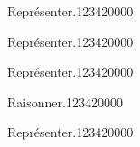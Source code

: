 \begin{pageParcoursu} 

\begin{ExoCu}{Représenter.}{1234}{2}{0}{0}{0}{0}


 
 

\end{ExoCu}
\begin{ExoCu}{Représenter.}{1234}{2}{0}{0}{0}{0}

 
 
 


\end{ExoCu}
\begin{ExoCu}{Représenter.}{1234}{2}{0}{0}{0}{0}


\end{ExoCu}


\begin{ExoCu}{Raisonner.}{1234}{2}{0}{0}{0}{0}

 

 

\end{ExoCu}

\begin{ExoCu}{Représenter.}{1234}{2}{0}{0}{0}{0}
  
  


\end{ExoCu}

 


\end{pageParcoursu}

  




